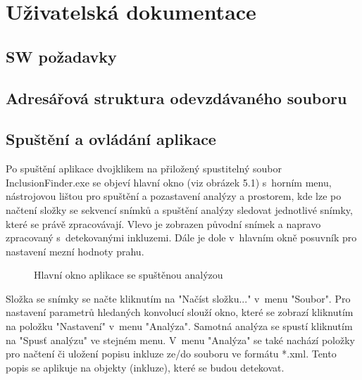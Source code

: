 \documentclass[12pt, a4paper]{report}
\begin{document}
\chapter{Uživatelská dokumentace}
	\section{SW požadavky}
	
	\section{Adresářová struktura odevzdávaného souboru}	
	
	\section{Spuštění a ovládání aplikace}	
Po spuštění aplikace dvojklikem na přiložený spustitelný soubor InclusionFinder.exe se objeví hlavní okno (viz obrázek 5.1) s~horním menu, nástrojovou lištou pro spuštění a pozastavení analýzy a prostorem, kde lze po načtení složky se sekvencí snímků a spuštění analýzy sledovat jednotlivé snímky, které se právě zpracovávají. Vlevo je zobrazen původní snímek a napravo zpracovaný s~detekovanými inkluzemi. Dále je dole v~hlavním okně posuvník pro nastavení mezní hodnoty prahu.

	\begin{figure}[!htb]
	\centering
	\label{fig:hlavni_okno}
	\caption{Hlavní okno aplikace se spuštěnou analýzou}
	\end{figure}

Složka se snímky se načte kliknutím na "Načíst složku..." v~menu "Soubor". Pro nastavení parametrů hledaných konvolucí slouží okno, které se zobrazí kliknutím na položku "Nastavení" v~menu "Analýza". Samotná analýza se spustí kliknutím na "Spusť analýzu" ve stejném menu. V~menu "Analýza" se také nachází položky pro načtení či uložení popisu inkluze ze/do souboru ve formátu *.xml. Tento popis se aplikuje na objekty (inkluze), které se budou detekovat.
\end{document}
